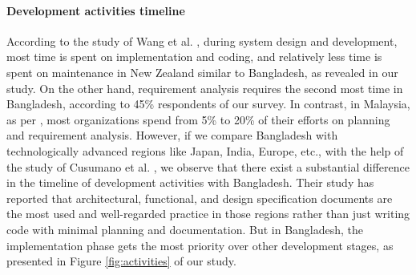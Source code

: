 \paragraph{Development activities timeline}
According to the study of Wang et al. \cite{Wang2018}, during system design and development, most time is spent on implementation and coding, and relatively less time is spent on maintenance in New Zealand similar to Bangladesh, as revealed in our study. On the other hand, requirement analysis requires the second most time in Bangladesh, according to 45\% respondents of our survey. In contrast, in Malaysia, as per \cite{Baharom2006}, most organizations spend from 5\% to 20\% of their efforts on planning and requirement analysis. However, if we compare Bangladesh with technologically advanced regions like Japan, India, Europe, etc., with the help of the study of Cusumano et al. \cite{Cusumano2003}, we observe that there exist a substantial difference in the timeline of development activities with Bangladesh. Their study has reported that architectural, functional, and design specification documents are the most used and well-regarded practice in those regions rather than just writing code with minimal planning and documentation. But in Bangladesh, the implementation phase gets the most priority over other development stages, as presented in Figure \ref{fig:activities} of our study.